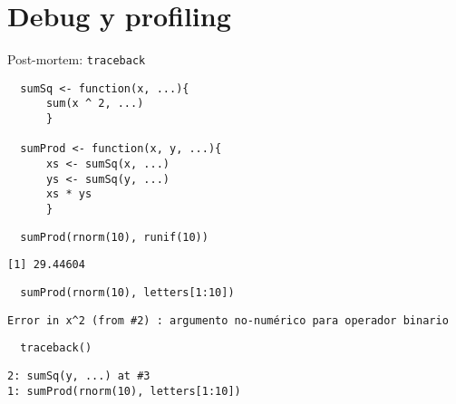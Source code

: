 \documentclass[xcolor={usenames,svgnames,dvipsnames}]{beamer}
\begin{document}
\section{Debug y profiling}
\label{sec:orgheadline27}

\begin{frame}[fragile,label={sec:orgheadline20}]{Post-mortem: \texttt{traceback}}
 \lstset{language=R,label= ,caption= ,captionpos=b,numbers=none}
\begin{lstlisting}
  sumSq <- function(x, ...){
      sum(x ^ 2, ...)
      }
  
  sumProd <- function(x, y, ...){
      xs <- sumSq(x, ...)
      ys <- sumSq(y, ...)
      xs * ys
      }
\end{lstlisting}

\lstset{language=R,label= ,caption= ,captionpos=b,numbers=none}
\begin{lstlisting}
  sumProd(rnorm(10), runif(10))
\end{lstlisting}

\begin{verbatim}
[1] 29.44604
\end{verbatim}

\lstset{language=R,label= ,caption= ,captionpos=b,numbers=none}
\begin{lstlisting}
  sumProd(rnorm(10), letters[1:10])
\end{lstlisting}

\begin{verbatim}
Error in x^2 (from #2) : argumento no-numérico para operador binario
\end{verbatim}

\lstset{language=R,label= ,caption= ,captionpos=b,numbers=none}
\begin{lstlisting}
  traceback()
\end{lstlisting}

\begin{verbatim}
2: sumSq(y, ...) at #3
1: sumProd(rnorm(10), letters[1:10])
\end{verbatim}
\end{frame}
\end{document}
